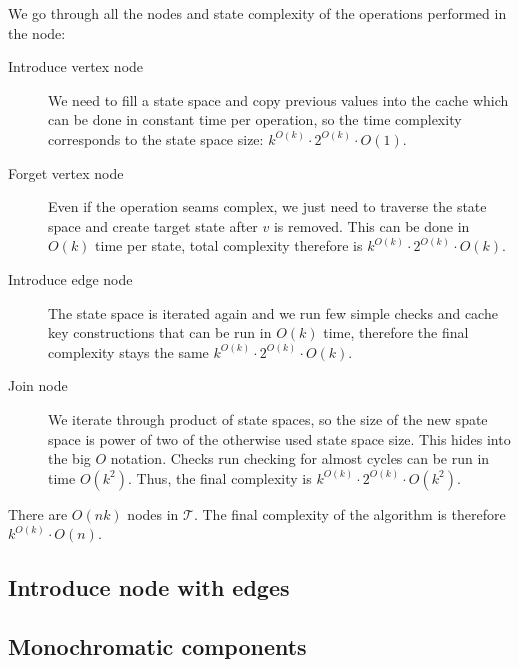 We go through all the nodes and state complexity of the operations performed in the node:
\begin{description}
	\item[Introduce vertex node]
	      We need to fill a state space and copy previous values into the cache
	      which can be done in constant time per operation,
	      so the time complexity corresponds to the state space size:
	      \( {k}^{O(k)} \cdot 2^{O(k)} \cdot O(1) \).
	\item[Forget vertex node]
	      Even if the operation seams complex, we just need to traverse the state space
	      and create target state after \( v \) is removed. This can be done in \( O(k) \) time
	      per state, total complexity therefore is
	      \( {k}^{O(k)} \cdot 2^{O(k)} \cdot O(k) \).
	\item[Introduce edge node]
	      The state space is iterated again and we run few simple checks and cache key constructions
	      that can be run in \( O(k) \) time, therefore the final complexity stays the same
	      \( {k}^{O(k)} \cdot 2^{O(k)} \cdot O(k) \).
	\item[Join node]
	      We iterate through product of state spaces,
	      so the size of the new spate space is power of two
	      of the otherwise used state space size.
	      This hides into the big \( O \) notation.
	      Checks run checking for almost cycles can be run in time \( O(k^2) \).
	      Thus, the final		complexity is
	      \( {k}^{O(k)} \cdot 2^{O(k)} \cdot O(k^2) \).
\end{description}

There are \( O(nk) \) nodes in \( \mathcal{T} \).
The final complexity of the algorithm is therefore
\( {k}^{O(k)} \cdot O(n) \).

\subsection{Introduce node with edges}
\subsection{Monochromatic components}

